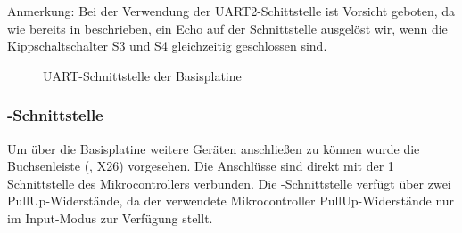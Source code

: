 \begin{warning}
    Anmerkung: Bei der Verwendung der UART2-Schittstelle ist Vorsicht geboten, da wie bereits in  beschrieben, ein Echo auf der Schnittstelle ausgelöst wir, wenn die Kippschaltschalter S3 und S4 gleichzeitig geschlossen sind.
\end{warning}

\begin{figure}[htb]
    \centering
    \qquad
    \qquad
    \caption[UART-Schnittstelle der Basisplatine]{UART-Schnittstelle der \gls{Basisplatine}}
    \label{fig:basisplatine-uart}
\end{figure}

\subsubsection{\IIC{}-Schnittstelle}
Um über die \gls{Basisplatine} weitere \IIC{} Geräten anschließen zu können wurde die Buchsenleiste (, X26) vorgesehen. Die Anschlüsse sind direkt mit der \IIC{}1 Schnittstelle des Mikrocontrollers verbunden. Die \IIC{}-Schnittstelle verfügt über zwei PullUp-Widerstände, da der verwendete Mikrocontroller PullUp-Widerstände nur im Input-Modus zur Verfügung stellt.

